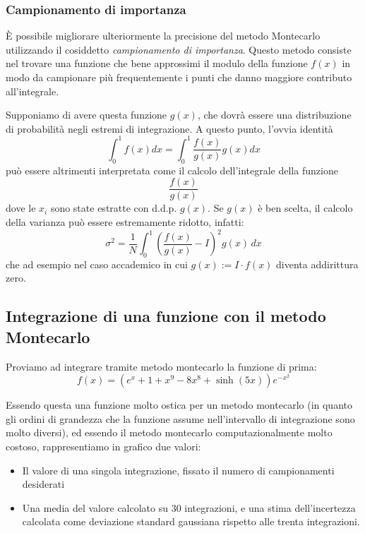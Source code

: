 \documentclass[a4paper,10pt]{article}
\begin{document}
\subsubsection{Campionamento di importanza}
È possibile migliorare ulteriormente la precisione del metodo Montecarlo utilizzando il cosiddetto \textit{campionamento di importanza}. Questo metodo consiste nel trovare una funzione che bene approssimi il modulo della funzione $f(x)$ in modo da campionare più frequentemente i punti che danno maggiore contributo all'integrale.

Supponiamo di avere questa funzione $g(x)$, che dovrà essere una distribuzione di probabilità negli estremi di integrazione. A questo punto, l'ovvia identità
$$\int_0^1f(x)dx = \int_0^1\frac{f(x)}{g(x)} g(x)dx$$
può essere altrimenti interpretata come il calcolo dell'integrale della funzione $$\frac{f(x)}{g(x)}$$ dove le $x_i$ sono state estratte con d.d.p. $g(x)$. Se $g(x)$ è ben scelta, il calcolo della varianza può essere estremamente ridotto, infatti:
$$\sigma^2 = \frac{1}{N} \int_0^1 (\frac{f(x)}{g(x)}-I)^2 g(x)\,dx$$
che ad esempio nel caso accademico in cui $g(x):=I\cdot f(x)$ diventa addirittura zero.

\subsection{Integrazione di una funzione con il metodo Montecarlo}
Proviamo ad integrare tramite metodo montecarlo la funzione di prima:
$$f(x) = (e^x+1+x^9-8x^8+\sinh(5x))e^{-x^2}$$

Essendo questa una funzione molto ostica per un metodo montecarlo (in quanto gli ordini di grandezza che la funzione assume nell'intervallo di integrazione sono molto diversi), ed essendo il metodo montecarlo computazionalmente molto costoso, rappresentiamo in grafico due valori:
\begin{itemize}
 \item Il valore di una singola integrazione, fissato il numero di campionamenti desiderati
 \item Una media del valore calcolato su 30 integrazioni, e una stima dell'incertezza calcolata come deviazione standard gaussiana rispetto alle trenta integrazioni.
\end{itemize}
\end{document}
